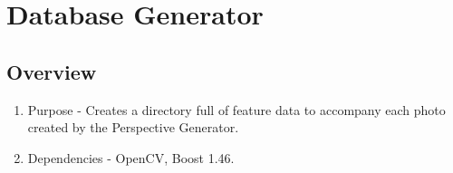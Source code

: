 \documentclass[a4paper,11pt]{article}
\begin{document}
        
        \newpage
    

        



\section{Database Generator}
  \subsection{Overview}
    \begin{enumerate}
    \item Purpose - Creates a directory full of feature data to accompany each photo created by the Perspective Generator. 
    \item Dependencies - OpenCV, Boost 1.46.
    \end{enumerate}
    
\end{document}

